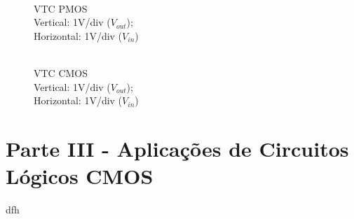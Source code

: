 \documentclass[pdftex,12pt,a4paper]{report}
\begin{document}
\begin{figure}[!htb]
  \centerline{}
  \caption{\\VTC PMOS \\Vertical: 1V/div ($V_{out}$); \\Horizontal: 1V/div ($V_{in}$)}
\endminipage\hfill
{}
  \centerline{}
  \caption{\\VTC CMOS \\Vertical: 1V/div ($V_{out}$); \\Horizontal: 1V/div ($V_{in}$)}
\endminipage\hfill
\end{figure}


\section{Parte III - Aplicações	de	Circuitos	Lógicos	CMOS}
dfh
\end{document}
